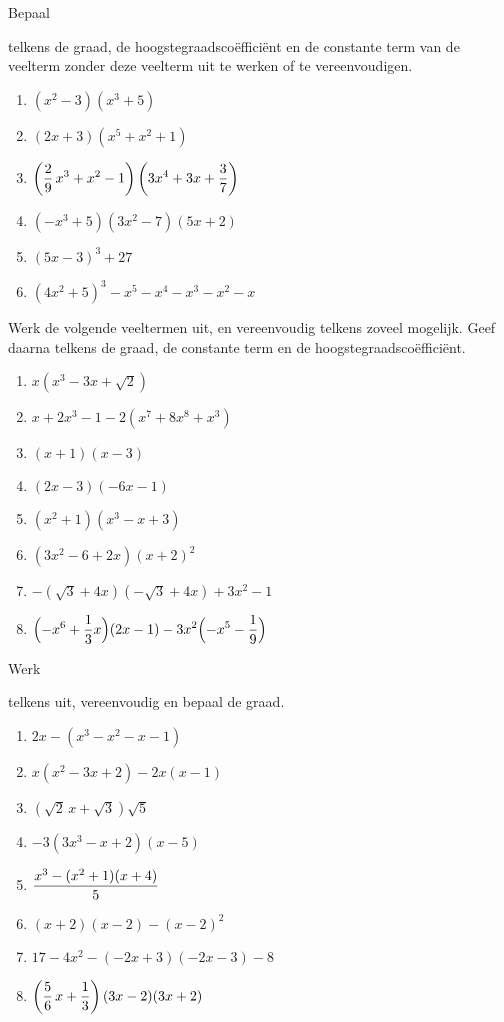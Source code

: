 \documentclass{ximera}
\begin{document}
\begin{Oefening}\setcounter{enumi}{5}
\hypertarget{oef1.5}{Bepaal} telkens de graad, de hoogstegraadsco\"effici\"ent en de constante term van de veelterm zonder deze veelterm uit te werken of te vereenvoudigen. 
\begin{multicols}{2}
\begin{enumerate}%
\item
$(x^2-3)(x^3+5)$
\item
$(2x+3)(x^5+x^2+1)$
\item
$\displaystyle \left(\frac{2}{9}\,x^3+x^2-1\right)\left(3x^4+3x+\frac{3}{7}\right)$
\item
$(-x^3+5)(3x^2-7)(5x+2)$
\item
$(5x-3)^3+27$
\item
$(4x^2+5)^3-x^5-x^4-x^3-x^2-x$
\end{enumerate}
\end{multicols}
\end{Oefening}

\pagebreak

\begin{Oefening} %
Werk de volgende veeltermen uit, en vereenvoudig telkens zoveel mogelijk. Geef daarna telkens de graad, de constante term en de hoogstegraadsco\"effici\"ent.
\begin{multicols}{2}
\begin{enumerate}%
\item
$x(x^3-3x+\sqrt{2})$
\item
$x+2x^3-1-2(x^7+8x^8+x^3)$
\item
$(x+1)(x-3)$
\item
$(2x-3)(-6x-1)$
\item
$(x^2+1)(x^3-x+3)$
\item
$(3x^2-6+2x)(x+2)^2$
\item
$-(\sqrt{3}+4x)(-\sqrt{3}+4x)+3x^2-1$
\item
$\displaystyle \Bigl(-x^6 + \frac{1}{3}x\Bigr)(2x-1) - 3x^2\Bigl(-x^5-\frac{1}{9}\Bigr)$
\end{enumerate}
\end{multicols} 
\end{Oefening}

\begin{Oefening}\setcounter{enumi}{7}
\hypertarget{oef1.7}{Werk} telkens uit, vereenvoudig en bepaal de graad. 
\begin{multicols}{2}
\begin{enumerate}%
\item
$2x-(x^3-x^2-x-1)$
\item
$x(x^2-3x+2)-2x(x-1)$
\item
$\left(\sqrt{2}\,x+\sqrt{3}\right)\sqrt{5}$
\item
$-3(3x^3-x+2)(x-5)$
\item
$\displaystyle \frac{x^3-(x^2+1)(x+4)}{5}$
\item
$(x+2)(x-2)-(x-2)^2$
\item
$17-4x^2-(-2x+3)(-2x-3)-8$
\item
$\displaystyle \left(\frac{5}{6}\,x+\frac{1}{3}\right)(3x-2)(3x+2)$
\end{enumerate}
\end{multicols}
\end{Oefening}
\end{document}
